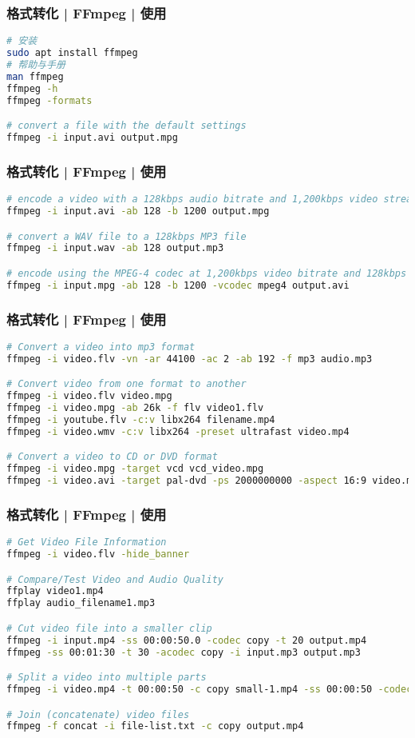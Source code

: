 \begin{frame}[fragile]
  \frametitle{格式转化 | FFmpeg | \alert{使用}}
\begin{lstlisting}[language=bash]
# 安装
sudo apt install ffmpeg
# 帮助与手册
man ffmpeg
ffmpeg -h
ffmpeg -formats

# convert a file with the default settings
ffmpeg -i input.avi output.mpg
\end{lstlisting}
\end{frame}

\begin{frame}[fragile]
  \frametitle{格式转化 | FFmpeg | 使用}
\begin{lstlisting}[language=bash,basicstyle=\small\tt]
# encode a video with a 128kbps audio bitrate and 1,200kbps video stream
ffmpeg -i input.avi -ab 128 -b 1200 output.mpg

# convert a WAV file to a 128kbps MP3 file
ffmpeg -i input.wav -ab 128 output.mp3

# encode using the MPEG-4 codec at 1,200kbps video bitrate and 128kbps audio bitrate
ffmpeg -i input.mpg -ab 128 -b 1200 -vcodec mpeg4 output.avi
\end{lstlisting}
\end{frame}

\begin{frame}[fragile]
  \frametitle{格式转化 | FFmpeg | 使用}
\begin{lstlisting}[language=bash,basicstyle=\small\tt]
# Convert a video into mp3 format
ffmpeg -i video.flv -vn -ar 44100 -ac 2 -ab 192 -f mp3 audio.mp3

# Convert video from one format to another
ffmpeg -i video.flv video.mpg
ffmpeg -i video.mpg -ab 26k -f flv video1.flv
ffmpeg -i youtube.flv -c:v libx264 filename.mp4
ffmpeg -i video.wmv -c:v libx264 -preset ultrafast video.mp4

# Convert a video to CD or DVD format
ffmpeg -i video.mpg -target vcd vcd_video.mpg
ffmpeg -i video.avi -target pal-dvd -ps 2000000000 -aspect 16:9 video.mpeg
\end{lstlisting}
\end{frame}

\begin{frame}[fragile]
  \frametitle{格式转化 | FFmpeg | 使用}
\begin{lstlisting}[language=bash,basicstyle=\footnotesize\tt,numberstyle=\scriptsize]
# Get Video File Information
ffmpeg -i video.flv -hide_banner

# Compare/Test Video and Audio Quality
ffplay video1.mp4
ffplay audio_filename1.mp3

# Cut video file into a smaller clip
ffmpeg -i input.mp4 -ss 00:00:50.0 -codec copy -t 20 output.mp4
ffmpeg -ss 00:01:30 -t 30 -acodec copy -i input.mp3 output.mp3

# Split a video into multiple parts
ffmpeg -i video.mp4 -t 00:00:50 -c copy small-1.mp4 -ss 00:00:50 -codec copy small-2.mp4

# Join (concatenate) video files
ffmpeg -f concat -i file-list.txt -c copy output.mp4
\end{lstlisting}
\end{frame}

